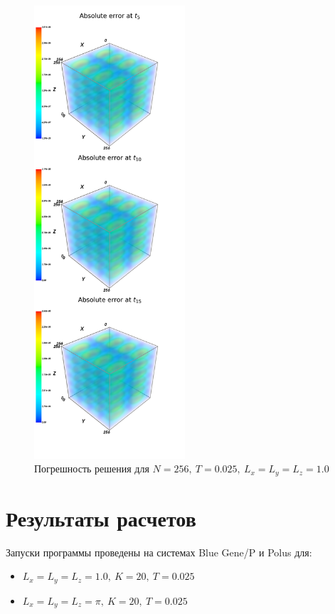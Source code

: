 \documentclass[oneside, final, 12pt]{extarticle}
\begin{document}
\begin{figure}[H]
    \centering
    \includegraphics[width=0.5\textwidth]{errs.png}
    \caption{Погрешность решения для $ N = 256, \: T = 0.025, \: L_x = L_y = L_z = 1.0 $}
\end{figure}

\section{Результаты расчетов}

Запуски программы проведены на системах Blue Gene/P и Polus для:
\begin{itemize}
    \item $ L_x = L_y = L_z = 1.0, \: K = 20, \: T = 0.025 $
    \item $ L_x = L_y = L_z = \pi, \: K = 20, \: T = 0.025 $
\end{itemize}
\end{document}
